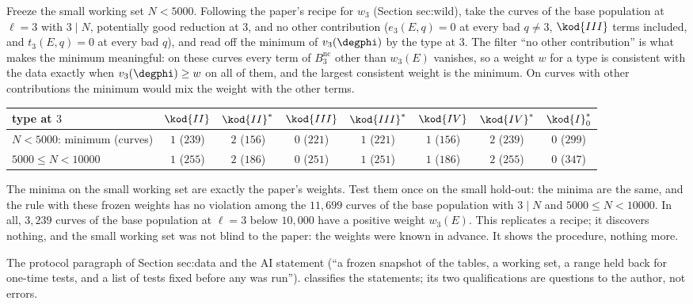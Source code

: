 \begin{sloppypar}
\begin{example}\label{ex:computation:toy-protocol}
Freeze the small working set $N<5000$. Following the paper's recipe for $w_3$ (Section sec:wild), take the curves of the base population at $\ell=3$
with $3\mid N$, potentially good reduction at $3$, and no other contribution ($e_3(E,q)=0$ at every bad $q\ne3$, $\kod{III}$ terms included, and $t_3(E,q)=0$
at every bad $q$), and read off the minimum of $v_3(\degphi)$ by the type at $3$. The filter ``no other contribution'' is what makes the minimum
meaningful: on these curves every term of $B^{\mathrm{nc}}_3$ other than $w_3(E)$ vanishes, so a weight $w$ for a type is consistent with the data exactly
when $v_3(\degphi)\ge w$ on all of them, and the largest consistent weight is the minimum. On curves with other contributions the minimum would
mix the weight with the other terms.
\begin{center}\small
\begin{tabular}{lccccccc}
\toprule
type at $3$ & $\kod{II}$ & $\kod{II}^*$ & $\kod{III}$ & $\kod{III}^*$ & $\kod{IV}$ & $\kod{IV}^*$ & $\kod{I}_0^*$\\
\midrule
$N<5000$: minimum (curves) & $1$ ($239$) & $2$ ($156$) & $0$ ($221$) & $1$ ($221$) & $1$ ($156$) & $2$ ($239$) & $0$ ($299$)\\
$5000\le N<10000$ & $1$ ($255$) & $2$ ($186$) & $0$ ($251$) & $1$ ($251$) & $1$ ($186$) & $2$ ($255$) & $0$ ($347$)\\
\bottomrule
\end{tabular}
\end{center}
The minima on the small working set are exactly the paper's weights. Test them once on the small hold-out: the minima are the same, and the
rule with these frozen weights has no violation among the $11{,}699$ curves of the base population with $3\mid N$ and $5000\le N<10000$. In all,
$3{,}239$ curves of the base population at $\ell=3$ below $10{,}000$ have a positive weight $w_3(E)$. This replicates a recipe; it discovers nothing,
and the small working set was not blind to the paper: the weights were known in advance. It shows the procedure, nothing more.
\end{example}

\begin{paperlink}\label{pl:computation:protocol}
The protocol paragraph of Section sec:data and the AI statement (``a frozen snapshot of the tables, a working set, a range held back for
one-time tests, and a list of tests fixed before any was run'').  classifies the statements; its two
qualifications are questions to the author, not errors.
\end{paperlink}


\end{sloppypar}
